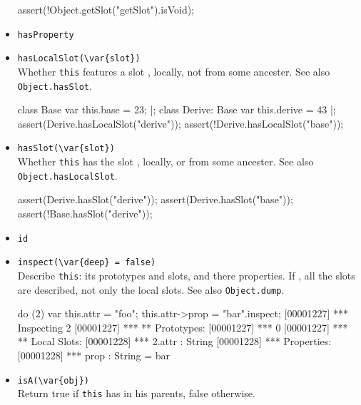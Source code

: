 \begin{itemize}
\begin{urbiscript}[firstnumber=last]
assert(!Object.getSlot("getSlot").isVoid);
\end{urbiscript}

\item \lstinline|hasProperty|\\

\item \lstinline|hasLocalSlot(\var{slot})|\\
  Whether \lstinline|this| features a slot , locally, not
  from some ancester.  See also \lstinline|Object.hasSlot|.

\begin{urbiscript}[firstnumber=last]
class Base         { var this.base = 23; } |;
class Derive: Base { var this.derive = 43 } |;
assert(Derive.hasLocalSlot("derive"));
assert(!Derive.hasLocalSlot("base"));
\end{urbiscript}

\item \lstinline|hasSlot(\var{slot})|\\
  Whether \lstinline|this| has the slot , locally, or from
  some ancester.  See also \lstinline|Object.hasLocalSlot|.

\begin{urbiscript}[firstnumber=last]
assert(Derive.hasSlot("derive"));
assert(Derive.hasSlot("base"));
assert(!Base.hasSlot("derive"));
\end{urbiscript}

\item \lstinline|id|\\

\item \lstinline|inspect(\var{deep} = false)|\\
  Describe \lstinline|this|: its prototypes and slots, and there
  properties.  If , all the slots are described, not only
  the local slots. See also \lstinline|Object.dump|.
\begin{urbiscript}[firstnumber=last]
do (2) { var this.attr = "foo"; this.attr->prop = "bar"}.inspect;
[00001227] *** Inspecting 2
[00001227] *** ** Prototypes:
[00001227] ***   0
[00001227] *** ** Local Slots:
[00001228] ***   2.attr : String
[00001228] ***     Properties:
[00001228] ***      prop : String = bar
\end{urbiscript}

\item \lstinline|isA(\var{obj})|\\
  Return true if \lstinline|this| has  in his parents, false
  otherwise.


\end{itemize}
